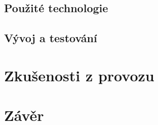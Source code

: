 \documentclass[12pt,oneside,final]{fithesis2}
\begin{document}
\section{Použité technologie}

\section{Vývoj a testování}



\chapter{Zkušenosti z provozu}




\chapter{Závěr}





\begin{flushleft}
\end{flushleft}
\end{document}
